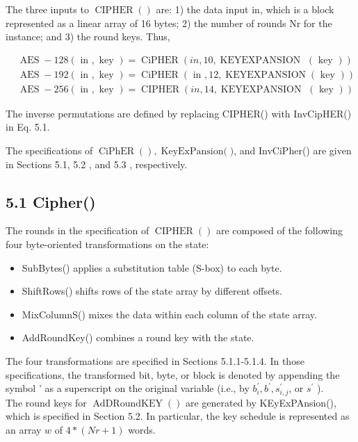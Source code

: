 The three inputs to \(\operatorname{CIPHER}()\) are: 1) the data input in, which is a block represented as a linear array of 16 bytes; 2) the number of rounds Nr for the instance; and 3) the round keys. Thus,

\[
\begin{aligned}
& \operatorname{AES}-128(\text { in }, \text { key })=\operatorname{CiPHER}(i n, 10, \operatorname{KEYEXPANSION~}(\text { key })) \\
& \operatorname{AES}-192(\text { in }, \text { key })=\operatorname{CiPHER}(\text { in }, 12, \operatorname{KEYEXPANSION}(\text { key })) \\
& \operatorname{AES}-256(\text { in }, \text { key })=\operatorname{CIPHER}(i n, 14, \operatorname{KEYEXPANSION~}(\text { key }))
\end{aligned}
\]

The inverse permutations are defined by replacing CIPHER() with InvCipHER() in Eq. 5.1.

The specifications of \(\operatorname{CiPhER}(), \operatorname{KeyExPansion(})\), and InvCiPher() are given in Sections 5.1, 5.2 , and 5.3 , respectively.

\subsection*{5.1 Cipher()}

The rounds in the specification of \(\operatorname{CIPHER}()\) are composed of the following four byte-oriented transformations on the state:

\begin{itemize}
  \item SubBytes() applies a substitution table (S-box) to each byte.
  \item ShiftRows() shifts rows of the state array by different offsets.
  \item MixColumnS() mixes the data within each column of the state array.
  \item AddRoundKey() combines a round key with the state.
\end{itemize}

The four transformations are specified in Sections 5.1.1-5.1.4. In those specifications, the transformed bit, byte, or block is denoted by appending the symbol ' as a superscript on the original variable (i.e., by \(b_{i}^{\prime}, b^{\prime}, s_{i, j}^{\prime}\), or \(s^{\prime}\) ).\\

The round keys for \(\operatorname{AdDRoundKEY}()\) are generated by KEyExPAnsion(), which is specified in Section 5.2. In particular, the key schedule is represented as an array \(w\) of \(4 *(N r+1)\) words.

